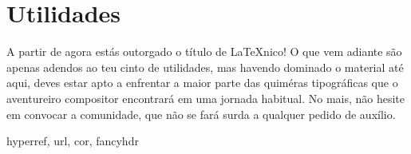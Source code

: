 \section{Utilidades}

A partir de agora estás outorgado o título de \LaTeX nico! O que vem
adiante são apenas adendos ao teu cinto de utilidades, mas havendo
dominado o material até aqui, deves estar apto a enfrentar a maior
parte das quiméras tipográficas que o aventureiro compositor
encontrará em uma jornada habitual. No mais, não hesite em convocar a
comunidade, que não se fará surda a qualquer pedido de auxílio.

hyperref, url, cor, fancyhdr
